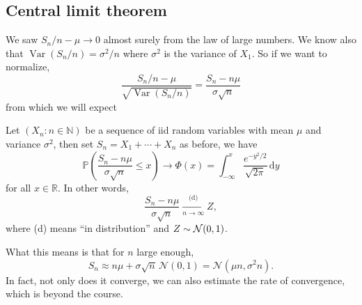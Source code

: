 \subsection{Central limit theorem}
We saw $S_n/n-\mu\to 0$ almost surely from the law of large numbers.
We know also that $\operatorname{Var}(S_n/n)=\sigma^2/n$ where $\sigma^2$ is the variance of $X_1$.
So if we want to normalize,
$$\frac{S_n/n-\mu}{\sqrt{\operatorname{Var}(S_n/n)}}=\frac{S_n-n\mu}{\sigma\sqrt{n}}$$
from which we will expect
\begin{theorem}
    Let $(X_n:n\in\mathbb N)$ be a sequence of iid random variables with mean $\mu$ and variance $\sigma^2$, then set $S_n=X_1+\cdots+X_n$ as before, we have
    $$\mathbb P\left( \frac{S_n-n\mu}{\sigma\sqrt{n}}\le x \right)\to\Phi(x)=\int_{-\infty}^x\frac{e^{-y^2/2}}{\sqrt{2\pi}}\,\mathrm dy$$
    for all $x\in\mathbb R$. In other words, 
    \[
        \frac{S_n-n\mu}{\sigma\sqrt{n}}\xrightarrow[n\to \infty]{\text{(d)}}Z,
    \]
    where (d) means ``in distribution'' and $ Z \sim {\mathcal{N}}(0,1) $.
\end{theorem}
\begin{note}
    What this means is that for $n$ large enough,
    \[
        S_n\approx n\mu+\sigma\sqrt{n}\,\mathcal N(0,1)=\mathcal N(\mu n,\sigma^2n).
    \]
    In fact, not only does it converge, we can also estimate the rate of convergence, which is beyond the course.
\end{note}
